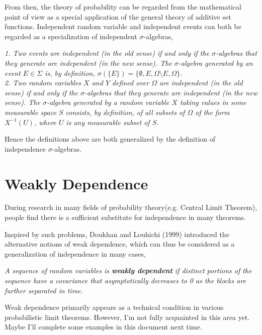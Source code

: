 \documentclass{article}
\begin{document}
From then, the theory of probability can be regarded from the mathematical point of view as a special application of the general theory of additive set functions. Independent random variable and independent events can both be regarded as a specialization of independent $\sigma$-algebras,
\begin{tcolorbox}[colback=black!0!white,colframe=red!75!black]
\slshape
1. Two events are independent (in the old sense) if and only if the $\sigma$-algebras that they generate are independent (in the new sense). The $\sigma$-algebra generated by an event $E\in \Sigma$  is, by definition,
$\sigma (\{E\})=\{\emptyset ,E,\Omega \setminus E,\Omega \}$.\\
2. Two random variables $X$ and $Y$ defined over $\Omega$ are independent (in the old sense) if and only if the $\sigma$-algebras that they generate are independent (in the new sense). The $\sigma$-algebra generated by a random variable $X$ taking values in some measurable space $S$ consists, by definition, of all subsets of $\Omega$  of the form $X^{-1}(U)$, where $U$ is any measurable subset of $S$.
\end{tcolorbox}

Hence the definitions above are both generalized by the definition of independence $\sigma$-algebras.

\section{Weakly Dependence}
During research in many fields of probability theory(e.g. Central Limit Theorem), people find there is a sufficient substitute for independence in many theorems. 

Inspired by such problems, Doukhan and Louhichi (1999) introduced  the alternative notions of weak dependence\cite{doukhan2008notion}, which can thus be considered as a generalization of independence in many cases,
\begin{tcolorbox}[colback=black!0!white,colframe=red!75!black]
\slshape
A sequence of random variables is \textbf{weakly dependent} if distinct portions of the sequence have a covariance that asymptotically decreases to 0 as the blocks are further separated in time. 
\end{tcolorbox}

Weak dependence primarily appears as a technical condition in various probabilistic limit theorems. However, I'm not fully acquainted in this area yet. Maybe I'll complete some examples in this document next time.
\printbibliography
\end{document}
